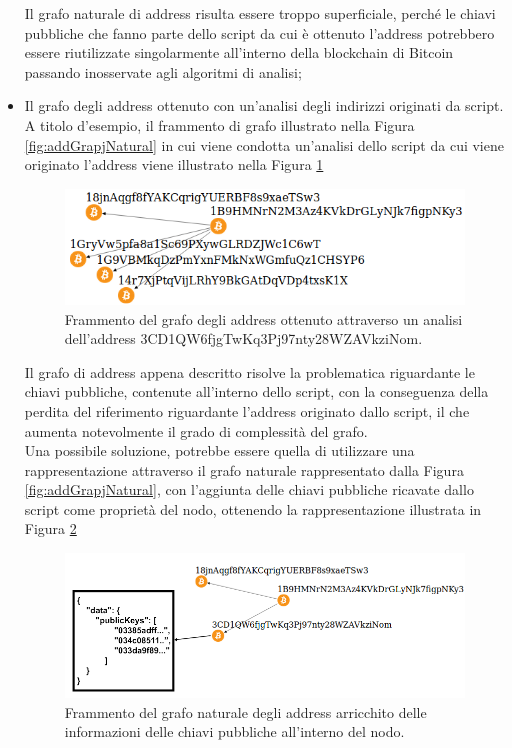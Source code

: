 \begin{itemize}
   Il grafo naturale di address risulta essere troppo superficiale, perché le chiavi pubbliche che fanno parte dello script da cui è ottenuto l'address  potrebbero essere riutilizzate singolarmente all'interno della blockchain di Bitcoin passando inosservate agli algoritmi di analisi;
   \item Il grafo degli address ottenuto con un'analisi degli indirizzi originati da script. A titolo d'esempio, il frammento di grafo illustrato nella Figura \ref{fig:addGrapjNatural} in cui viene condotta un'analisi dello script da cui viene originato l'address  viene illustrato nella Figura \ref{fig:addGraphAnalisis}
   \begin{figure}[H]
   \centering
   \includegraphics[scale=0.35]{images/exampleWithGraph/decode-address-graph-scam.png}
   \caption{Frammento del grafo degli address ottenuto attraverso un analisi dell'address 3CD1\-QW6fjg\-TwKq3Pj\-97nty28W\-ZAVkz\-iNom.\label{fig:addGraphAnalisis}}
   \end{figure}
   Il grafo di address appena descritto risolve la problematica riguardante le chiavi pubbliche, contenute all'interno dello script, con la conseguenza della perdita del riferimento riguardante l'address originato dallo script, il che aumenta notevolmente il grado di complessità del grafo.\\
   Una possibile soluzione, potrebbe essere quella di utilizzare una rappresentazione attraverso il grafo naturale rappresentato dalla Figura \ref{fig:addGrapjNatural}, con l'aggiunta delle chiavi pubbliche ricavate dallo script come proprietà del nodo, ottenendo la rappresentazione illustrata in Figura \ref{fig:addGrapjNaturalPlus}
   \begin{figure}[H]
   \centering
   \includegraphics[scale=1.4]{images/exampleWithGraph/naturalAddressGrahScamTx_correcter.png}
   \caption{Frammento del grafo naturale degli address arricchito delle informazioni delle chiavi pubbliche all'interno del nodo.\label{fig:addGrapjNaturalPlus}}
   \end{figure}
 \end{itemize}


